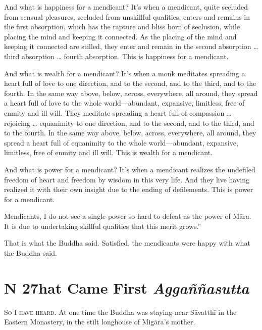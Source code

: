 \documentclass[12pt,openany]{book}%
\newcommand*{\suttatitleacronym}[1]{\smaller[2]{#1}\vspace*{.3em}}
\newcommand*{\suttatitletranslation}[1]{\linebreak{#1}}
\newcommand*{\suttatitleroot}[1]{\linebreak\smaller[2]\itshape{#1}}
\newcommand*{\tocacronym}[1]{\hspace*{-3.3em}{#1}\quad}
\newcommand*{\toctranslation}[1]{#1}
\newcommand*{\tocroot}[1]{(\textit{#1})}
\newcommand*{\scevam}[1]{\textsc{#1}}
\begin{document}
And what is happiness for a mendicant? It’s when a mendicant, quite secluded from sensual pleasures, secluded from unskillful qualities, enters and remains in the first absorption, which has the rapture and bliss born of seclusion, while placing the mind and keeping it connected. As the placing of the mind and keeping it connected are stilled, they enter and remain in the second absorption … third absorption … fourth absorption. This is happiness for a mendicant. 

And what is wealth for a mendicant? It’s when a monk meditates spreading a heart full of love to one direction, and to the second, and to the third, and to the fourth. In the same way above, below, across, everywhere, all around, they spread a heart full of love to the whole world—abundant, expansive, limitless, free of enmity and ill will. They meditate spreading a heart full of compassion … rejoicing … equanimity to one direction, and to the second, and to the third, and to the fourth. In the same way above, below, across, everywhere, all around, they spread a heart full of equanimity to the whole world—abundant, expansive, limitless, free of enmity and ill will. This is wealth for a mendicant. 

And what is power for a mendicant? It’s when a mendicant realizes the undefiled freedom of heart and freedom by wisdom in this very life. And they live having realized it with their own insight due to the ending of defilements. This is power for a mendicant. 

Mendicants, I do not see a single power so hard to defeat as the power of \textsanskrit{Māra}. It is due to undertaking skillful qualities that this merit grows.” 

That is what the Buddha said. Satisfied, the mendicants were happy with what the Buddha said. 

%
\chapter*{{\suttatitleacronym DN 27}{\suttatitletranslation What Came First }{\suttatitleroot Aggaññasutta}}
\addcontentsline{toc}{chapter}{\tocacronym{DN 27} \toctranslation{What Came First } \tocroot{Aggaññasutta}}

\scevam{So I have heard. }At one time the Buddha was staying near \textsanskrit{Sāvatthī} in the Eastern Monastery, in the stilt longhouse of \textsanskrit{Migāra}’s mother. 
\end{document}
